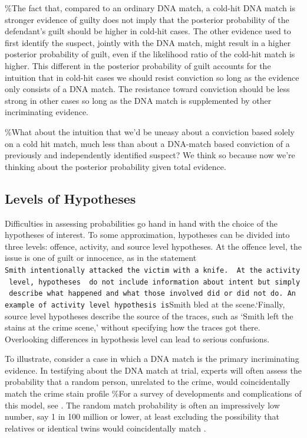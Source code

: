 \documentclass[10pt,dvipsnames,enabledeprecatedfontcommands]{scrartcl}
\begin{document}
\%The fact that, compared to an ordinary DNA match, a cold-hit DNA match
is stronger evidence of guilty does not imply that the posterior
probability of the defendant's guilt should be higher in cold-hit cases.
The other evidence used to first identify the suspect, jointly with the
DNA match, might result in a higher posterior probability of guilt, even
if the likelihood ratio of the cold-hit match is higher. This different
in the posterior probability of guilt accounts for the intuition that in
cold-hit cases we should resist conviction so long as the evidence only
consists of a DNA match. The resistance toward conviction should be less
strong in other cases so long as the DNA match is supplemented by other
incriminating evidence.

\%What about the intuition that we'd be uneasy about a conviction based
solely on a cold hit match, much less than about a DNA-match based
conviction of a previously and independently identified suspect? We
think so because now we're thinking about the posterior probability
given total evidence.

\subsection{Levels of Hypotheses}\label{levels-of-hypotheses}


Difficulties in assessing probabilities go hand in hand with the choice
of the hypotheses of interest. To some approximation, hypotheses can be
divided into three levels: offence, activity, and source level
hypotheses. At the offence level, the issue is one of guilt or
innocence, as in the statement
\texttt{Smith\ intentionally\ attacked\ the\ victim\ with\ a\ knife\textquotesingle{}.\ \ At\ the\ activity\ level,\ hypotheses\ \ do\ not\ include\ information\ about\ intent\ but\ simply\ describe\ what\ happened\ and\ what\ those\ involved\ did\ or\ did\ not\ do.\ An\ example\ of\ activity\ level\ hypothesis\ is}Smith
bled at the scene.`Finally, source level hypotheses describe the source
of the traces, such as `Smith left the stains at the crime scene,'
without specifying how the traces got there. Overlooking differences in
hypothesis level can lead to serious confusions.

To illustrate, consider a case in which a DNA match is the primary
incriminating evidence. In testifying about the DNA match at trial,
experts will often assess the probability that a random person,
unrelated to the crime, would coincidentally match the crime stain
profile \%For a survey of developments and complications of this model,
see \citep{foreman2003interpreting}. The random match probability is
often an impressively low number, say 1 in 100 million or lower, at
least excluding the possibility that relatives or identical twins would
coincidentally match
\citep{donnelly1995NonindependenceMatchesDifferent}.
\end{document}
